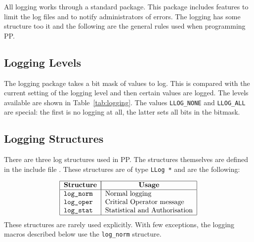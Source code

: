 All logging works through a standard package. This package includes
features to limit the log files and to notify administrators of errors.
The logging has some structure too it and the following are the
general rules used when programming PP.

\subsection	{Logging Levels}

The logging package takes a bit mask of values to log. This is
compared with the current setting of the logging level and then
certain values are logged. The levels available are shown in
Table~\ref{tab:logging}. The values \verb|LLOG_NONE| and
\verb|LLOG_ALL| are special: the first is no logging at all, the
latter sets all bits in the bitmask.


\subsection	{Logging Structures}

There are three log structures used in PP. The structures themselves
are defined in the include file .  These
structures are of type \mbox{\verb|LLog *|} and are the
following:

%
\[\begin{tabular}{|l|l|}
\hline
	\multicolumn{1}{|c|}{\bf Structure}&
		\multicolumn{1}{|c|}{\bf Usage}\\
\hline
	\tt log\_norm&	Normal logging\\
	\tt log\_oper&	Critical Operator message\\
	\tt log\_stat&	Statistical and Authorisation \\
\hline
\end{tabular}\]
These structures are rarely used explicitly. With few exceptions, the
logging macros described below use the \verb|log_norm| structure.

